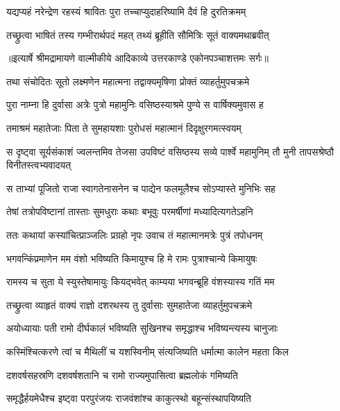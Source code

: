 \twolineshloka
{यद्यप्यहं नरेन्द्रेण रहस्यं श्रावितः पुरा}
{तच्चाप्युदाहरिष्यामि दैवं हि दुरतिक्रमम्} %

\twolineshloka
{तच्छ्रुत्वा भाषितं तस्य गम्भीरार्थपदं महत्}
{तथ्यं ब्रूहीति सौमित्रिः सूतं वाक्यमथाब्रवीत्} %


{॥इत्यार्षे श्रीमद्रामायणे वाल्मीकीये आदिकाव्ये उत्तरकाण्डे एकोनपञ्चाशत्तमः सर्गः॥}


\twolineshloka
{तथा संचोदितः सूतो लक्ष्मणेन महात्मना}
{तद्वाक्यमृषिणा प्रोक्तं व्याहर्तुमुपचक्रमे} %

\twolineshloka
{पुरा नाम्ना हि दुर्वासा अत्रेः पुत्रो महामुनिः}
{वसिष्ठस्याश्रमे पुण्ये स वार्षिक्यमुवास ह} %

\twolineshloka
{तमाश्रमं महातेजाः पिता ते सुमहायशाः}
{पुरोधसं महात्मानं दिदृक्षुरगमत्स्वयम्} %

\threelineshloka
{स दृष्ट्वा सूर्यसंकाशं ज्वलन्तमिव तेजसा}
{उपविष्टं वसिष्ठस्य सव्ये पार्श्वे महामुनिम्}
{तौ मुनी तापसश्रेष्ठौ विनीतस्त्वभ्यवादयत्} %

\twolineshloka
{स ताभ्यां पूजितो राजा स्वागतेनासनेन च}
{पाद्येन फलमूलैश्च सोऽप्यास्ते मुनिभिः सह} %

\twolineshloka
{तेषां तत्रोपविष्टानां तास्ताः सुमधुराः कथाः}
{बभूवुः परमर्षीणां मध्यादित्यगतेऽहनि} %

\twolineshloka
{ततः कथायां कस्यांचित्प्राञ्जलिः प्रग्रहो नृपः}
{उवाच तं महात्मानमत्रेः पुत्रं तपोधनम्} %

\twolineshloka
{भगवन्किंप्रमाणेन मम वंशो भविष्यति}
{किमायुश्च हि मे रामः पुत्राश्चान्ये किमायुषः} %

\twolineshloka
{रामस्य च सुता ये स्युस्तेषामायुः कियद्भवेत्}
{काम्यया भगवन्ब्रूहि वंशस्यास्य गतिं मम} %

\twolineshloka
{तच्छ्रुत्वा व्याहृतं वाक्यं राज्ञो दशरथस्य तु}
{दुर्वासाः सुमहातेजा व्याहर्तुमुपचक्रमे} %

\twolineshloka
{अयोध्यायाः पती रामो दीर्घकालं भविष्यति}
{सुखिनश्च समृद्धाश्च भविष्यन्त्यस्य चानुजाः} %

\twolineshloka
{कस्मिंश्चित्करणे त्वां च मैथिलीं च यशस्विनीम्}
{संत्यजिष्यति धर्मात्मा कालेन महता किल} %

\twolineshloka
{दशवर्षसहस्रणि दशवर्षशतानि च}
{रामो राज्यमुपासित्वा ब्रह्मलोकं गमिष्यति} %

\twolineshloka
{समृद्धैर्हयमेधैश्च इष्ट्वा परपुरंजयः}
{राजवंशांश्च काकुत्स्थो बहून्संस्थापयिष्यति} %

